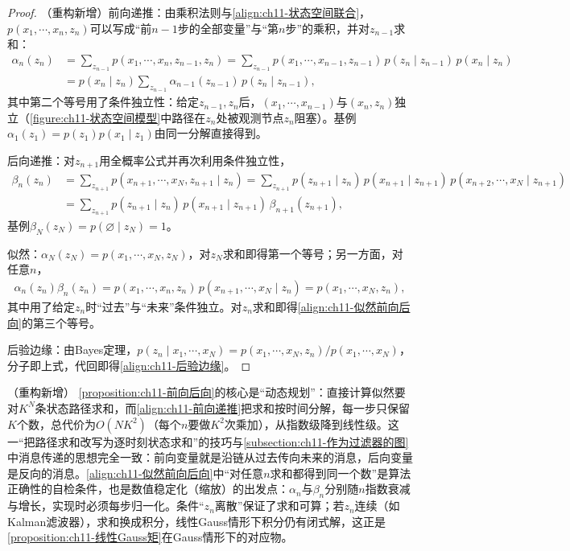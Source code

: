 \documentclass[../../main.tex]{subfiles}
\begin{document}
\begin{proof}
（重构新增）前向递推：由乘积法则与\eqref{align:ch11-状态空间联合}，$p(x_1,\cdots,x_n,z_n)$可以写成“前$n-1$步的全部变量”与“第$n$步”的乘积，并对$z_{n-1}$求和：
\begin{align}
  \alpha_n(z_n) &= \sum_{z_{n-1}}p(x_1,\cdots,x_n,z_{n-1},z_n)
  = \sum_{z_{n-1}}p(x_1,\cdots,x_{n-1},z_{n-1})\,p(z_n\mid z_{n-1})\,p(x_n\mid z_n)\\
  &= p(x_n\mid z_n)\sum_{z_{n-1}}\alpha_{n-1}(z_{n-1})\,p(z_n\mid z_{n-1}),
\end{align}
其中第二个等号用了条件独立性：给定$z_{n-1},z_n$后，$(x_1,\cdots,x_{n-1})$与$(x_n,z_n)$独立（\cref{figure:ch11-状态空间模型}中路径在$z_n$处被观测节点$z_n$阻塞）。基例$\alpha_1(z_1)=p(z_1)p(x_1\mid z_1)$由同一分解直接得到。

后向递推：对$z_{n+1}$用全概率公式并再次利用条件独立性，
\begin{align}
  \beta_n(z_n) &= \sum_{z_{n+1}}p(x_{n+1},\cdots,x_N,z_{n+1}\mid z_n)
  = \sum_{z_{n+1}}p(z_{n+1}\mid z_n)\,p(x_{n+1}\mid z_{n+1})\,p(x_{n+2},\cdots,x_N\mid z_{n+1})\\
  &= \sum_{z_{n+1}}p(z_{n+1}\mid z_n)\,p(x_{n+1}\mid z_{n+1})\,\beta_{n+1}(z_{n+1}),
\end{align}
基例$\beta_N(z_N)=p(\varnothing\mid z_N)=1$。

似然：$\alpha_N(z_N)=p(x_1,\cdots,x_N,z_N)$，对$z_N$求和即得第一个等号；另一方面，对任意$n$，
\begin{align}
  \alpha_n(z_n)\beta_n(z_n)=p(x_1,\cdots,x_n,z_n)\,p(x_{n+1},\cdots,x_N\mid z_n)=p(x_1,\cdots,x_N,z_n),
\end{align}
其中用了给定$z_n$时“过去”与“未来”条件独立。对$z_n$求和即得\eqref{align:ch11-似然前向后向}的第三个等号。

后验边缘：由Bayes定理，$p(z_n\mid x_1,\cdots,x_N)=p(x_1,\cdots,x_N,z_n)/p(x_1,\cdots,x_N)$，分子即上式，代回即得\eqref{align:ch11-后验边缘}。
\end{proof}

\begin{remark}（重构新增）
\cref{proposition:ch11-前向后向}的核心是“动态规划”：直接计算似然要对$K^N$条状态路径求和，而\eqref{align:ch11-前向递推}把求和按时间分解，每一步只保留$K$个数，总代价为$O(NK^2)$（每个$n$要做$K^2$次乘加），从指数级降到线性级。这一“把路径求和改写为逐时刻状态求和”的技巧与\cref{subsection:ch11-作为过滤器的图}中消息传递的思想完全一致：前向变量就是沿链从过去传向未来的消息，后向变量是反向的消息。\eqref{align:ch11-似然前向后向}中“对任意$n$求和都得到同一个数”是算法正确性的自检条件，也是数值稳定化（缩放）的出发点：$\alpha_n$与$\beta_n$分别随$n$指数衰减与增长，实现时必须每步归一化。条件“$z_n$离散”保证了求和可算；若$z_n$连续（如Kalman滤波器），求和换成积分，线性Gauss情形下积分仍有闭式解，这正是\cref{proposition:ch11-线性Gauss矩}在Gauss情形下的对应物。
\end{remark}
\end{document}
